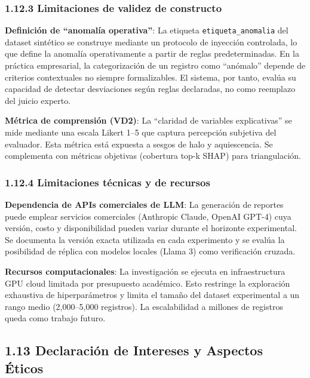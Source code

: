 \subsubsection{1.12.3 Limitaciones de validez de
constructo}\label{limitaciones-de-validez-de-constructo}

\textbf{Definición de ``anomalía operativa''}: La etiqueta
\texttt{etiqueta\_anomalia} del dataset sintético se construye mediante
un protocolo de inyección controlada, lo que define la anomalía
operativamente a partir de reglas predeterminadas. En la práctica
empresarial, la categorización de un registro como ``anómalo'' depende
de criterios contextuales no siempre formalizables. El sistema, por
tanto, evalúa su capacidad de detectar desviaciones según reglas
declaradas, no como reemplazo del juicio experto.

\textbf{Métrica de comprensión (VD2)}: La ``claridad de variables
explicativas'' se mide mediante una escala Likert 1--5 que captura
percepción subjetiva del evaluador. Esta métrica está expuesta a sesgos
de halo y aquiescencia. Se complementa con métricas objetivas (cobertura
top-k SHAP) para triangulación.

\subsubsection{1.12.4 Limitaciones técnicas y de
recursos}\label{limitaciones-tuxe9cnicas-y-de-recursos}

\textbf{Dependencia de APIs comerciales de LLM}: La generación de
reportes puede emplear servicios comerciales (Anthropic Claude, OpenAI
GPT-4) cuya versión, costo y disponibilidad pueden variar durante el
horizonte experimental. Se documenta la versión exacta utilizada en cada
experimento y se evalúa la posibilidad de réplica con modelos locales
(Llama 3) como verificación cruzada.

\textbf{Recursos computacionales}: La investigación se ejecuta en
infraestructura GPU cloud limitada por presupuesto académico. Esto
restringe la exploración exhaustiva de hiperparámetros y limita el
tamaño del dataset experimental a un rango medio (2,000--5,000
registros). La escalabilidad a millones de registros queda como trabajo
futuro.

\subsection{1.13 Declaración de Intereses y Aspectos
Éticos}\label{declaraciuxf3n-de-intereses-y-aspectos-uxe9ticos}

